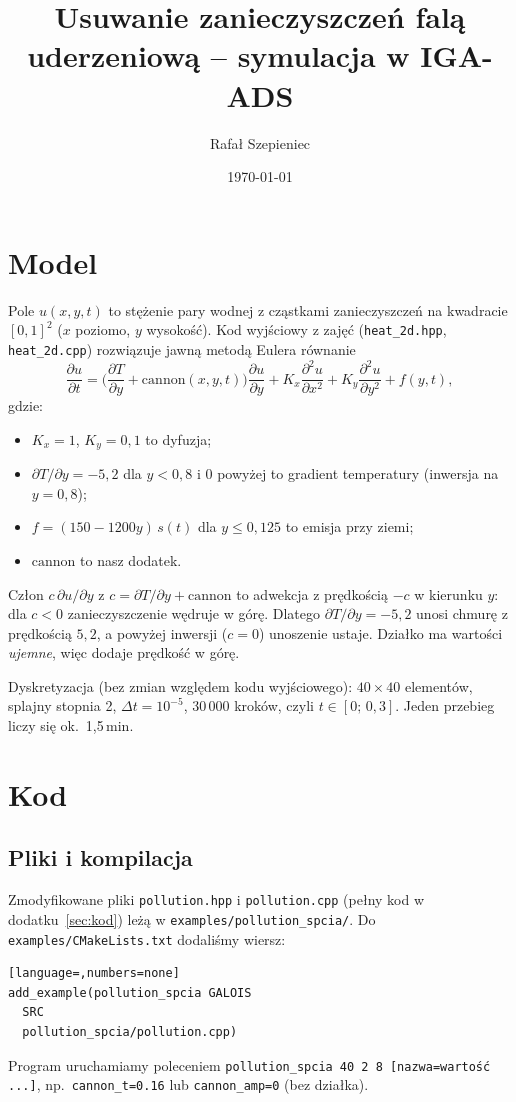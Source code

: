 \documentclass[11pt,a4paper]{article}
\title{Usuwanie zanieczyszczeń falą uderzeniową -- symulacja w IGA-ADS}
\author{Rafał Szepieniec}
\date{\today}
\begin{document}
\maketitle

\section{Model}

Pole $u(x,y,t)$ to stężenie pary wodnej z cząstkami zanieczyszczeń na kwadracie
$[0,1]^2$ ($x$ poziomo, $y$ wysokość). Kod wyjściowy z zajęć (\texttt{heat\_2d.hpp},
\texttt{heat\_2d.cpp}) rozwiązuje jawną metodą Eulera równanie
\[
\frac{\partial u}{\partial t} = \Big(\frac{\partial T}{\partial y} + \mathrm{cannon}(x,y,t)\Big)\frac{\partial u}{\partial y}
+ K_x \frac{\partial^2 u}{\partial x^2} + K_y \frac{\partial^2 u}{\partial y^2} + f(y,t),
\]
gdzie:
\begin{itemize}
\item $K_x = 1$, $K_y = 0{,}1$ to dyfuzja;
\item $\partial T/\partial y = -5{,}2$ dla $y < 0{,}8$ i $0$ powyżej to gradient temperatury
  (inwersja na $y = 0{,}8$);
\item $f = (150 - 1200y)\,s(t)$ dla $y \le 0{,}125$ to emisja przy ziemi;
\item $\mathrm{cannon}$ to nasz dodatek.
\end{itemize}

Człon $c\,\partial u/\partial y$ z $c = \partial T/\partial y + \mathrm{cannon}$ to adwekcja
z prędkością $-c$ w kierunku $y$: dla $c < 0$ zanieczyszczenie wędruje w górę.
Dlatego $\partial T/\partial y = -5{,}2$ unosi chmurę z prędkością $5{,}2$, a powyżej inwersji
($c = 0$) unoszenie ustaje. Działko ma wartości \emph{ujemne}, więc dodaje prędkość w górę.

Dyskretyzacja (bez zmian względem kodu wyjściowego): $40\times40$ elementów, splajny stopnia 2,
$\Delta t = 10^{-5}$, 30\,000 kroków, czyli $t \in [0;\,0{,}3]$.
Jeden przebieg liczy się ok.\ 1,5\,min.

\section{Kod}

\subsection{Pliki i kompilacja}

Zmodyfikowane pliki \texttt{pollution.hpp} i \texttt{pollution.cpp} (pełny kod w dodatku~\ref{sec:kod})
leżą w \texttt{examples/pollution\_spcia/}. Do \texttt{examples/CMakeLists.txt} dodaliśmy wiersz:
\begin{lstlisting}[language=,numbers=none]
add_example(pollution_spcia GALOIS
  SRC
  pollution_spcia/pollution.cpp)
\end{lstlisting}
Program uruchamiamy poleceniem
\texttt{pollution\_spcia 40 2 8 [nazwa=wartość ...]}, np.\ \texttt{cannon\_t=0.16} lub
\texttt{cannon\_amp=0} (bez działka).
\end{document}
